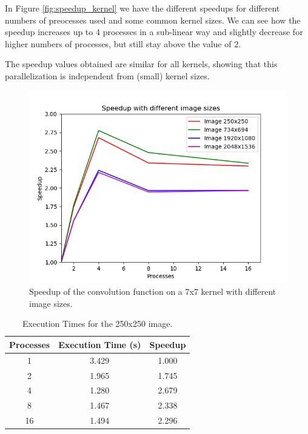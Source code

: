 \documentclass[10pt,twocolumn,letterpaper]{article}
\begin{document}
In Figure \ref{fig:speedup_kernel} we have the different speedups for different numbers of preocesses used and some common kernel sizes. We can see how the speedup increases up to 4 processes in a sub-linear way and slightly decrease for higher numbers of processes, but still stay above the value of 2.
 
The speedup values obtained are similar for all kernels, showing that this parallelization is independent from (small) kernel sizes.

\begin{figure}[H]
	\includegraphics[width=\linewidth]{images/speedup_by_img_sizes.png}
	\caption{Speedup of the convolution function on a 7x7 kernel with different image sizes.}
	\label{fig:speedup_img}
\end{figure}

\begin{table}[H]
	\begin{center}
		\begin{tabular}{|c|c|c|}
			\hline
			Processes & Execution Time (s) & Speedup \\
			\hline
			1 & 3.429 & 1.000 \\
			2 & 1.965 & 1.745 \\
			4 & 1.280 & 2.679 \\
			8 & 1.467 & 2.338 \\
			16 & 1.494 & 2.296 \\
			\hline
		\end{tabular}
	\end{center}
	\caption{Execution Times for the 250x250 image.}
	\label{tab:speedup_k_i_1}
\end{table}
\end{document}
